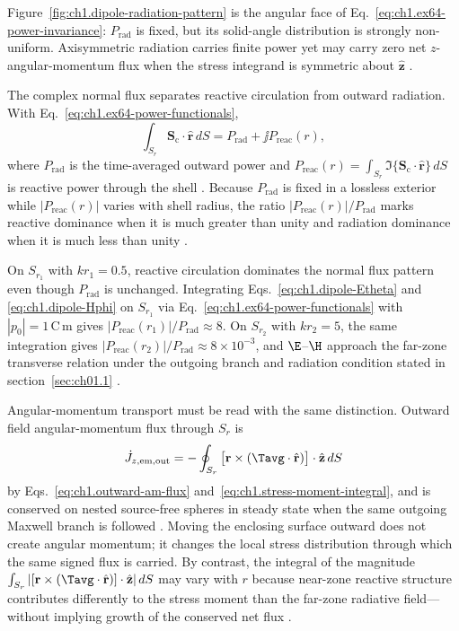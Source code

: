 Figure~\ref{fig:ch1.dipole-radiation-pattern} is the angular face of Eq.~\eqref{eq:ch1.ex64-power-invariance}: $P_{\mathrm{rad}}$ is fixed, but its solid-angle distribution is strongly non-uniform. Axisymmetric radiation carries finite power yet may carry zero net $z$-angular-momentum flux when the stress integrand is symmetric about $\hat{\mathbf{z}}$ \cite{beth1936}.

The complex normal flux separates reactive circulation from outward radiation. With Eq.~\eqref{eq:ch1.ex64-power-functionals},
\begin{equation}
\label{eq:ch1.ex64-complex-power}
\int_{S_r}\mathbf{S}_\mathrm{c}\cdot\hat{\mathbf{r}}\,dS=P_{\mathrm{rad}}+\jj P_{\mathrm{reac}}(r),
\end{equation}
where $P_{\mathrm{rad}}$ is the time-averaged outward power and $P_{\mathrm{reac}}(r)=\int_{S_r}\Im\{\mathbf{S}_\mathrm{c}\cdot\hat{\mathbf{r}}\}\,dS$ is reactive power through the shell \cite{poynting1884}. Because $P_{\mathrm{rad}}$ is fixed in a lossless exterior while $|P_{\mathrm{reac}}(r)|$ varies with shell radius, the ratio $|P_{\mathrm{reac}}(r)|/P_{\mathrm{rad}}$ marks reactive dominance when it is much greater than unity and radiation dominance when it is much less than unity \cite{stratton1941}.

On $S_{r_1}$ with $kr_1=0.5$, reactive circulation dominates the normal flux pattern even though $P_{\mathrm{rad}}$ is unchanged. Integrating Eqs.~\eqref{eq:ch1.dipole-Etheta} and \eqref{eq:ch1.dipole-Hphi} on $S_{r_1}$ via Eq.~\eqref{eq:ch1.ex64-power-functionals} with $|p_0|=1\,\mathrm{C\,m}$ gives $|P_{\mathrm{reac}}(r_1)|/P_{\mathrm{rad}}\approx 8$. On $S_{r_2}$ with $kr_2=5$, the same integration gives $|P_{\mathrm{reac}}(r_2)|/P_{\mathrm{rad}}\approx 8\times 10^{-3}$, and $\E$--$\H$ approach the far-zone transverse relation
under the outgoing branch and radiation condition stated in section~\ref{sec:ch01.1} \cite{stratton1941}.

Angular-momentum transport must be read with the same distinction. Outward field angular-momentum flux through $S_r$ is
\begin{equation}
\label{eq:ch1.ex64-am-flux-integral}
\dot J_{z,\mathrm{em,out}}
=-\oint_{S_r}\big[\mathbf{r}\times(\Tavg\cdot\hat{\mathbf{r}})\big]\cdot\hat{\mathbf{z}}\,dS
\end{equation}
by Eqs.~\eqref{eq:ch1.outward-am-flux} and~\eqref{eq:ch1.stress-moment-integral}, and is conserved on nested source-free spheres in steady state when the same outgoing Maxwell branch is followed \cite{stratton1941}. Moving the enclosing surface outward does not create angular momentum; it changes the local stress distribution through which the same signed flux is carried. By contrast, the integral of the magnitude $\int_{S_r}|[\mathbf{r}\times(\Tavg\cdot\hat{\mathbf{r}})]\cdot\hat{\mathbf{z}}|\,dS$ may vary with $r$ because near-zone reactive structure contributes differently to the stress moment than the far-zone radiative field---without implying growth of the conserved net flux \cite{stratton1941,beth1936}.

